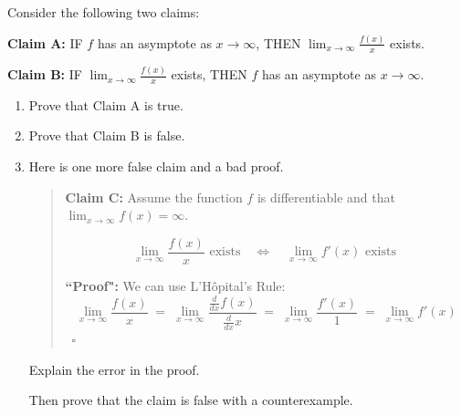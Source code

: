 \documentclass[12pt]{exam}
\newcommand {\DS} [1] {${\displaystyle #1}$}
\begin{document}
\begin{enumerate}
Consider the following two claims:	
			\begin{center}
				{\bf Claim A:} \quad \quad
					IF $f$ has an asymptote as $x \to \infty$,  \quad
					THEN \DS{\lim_{x \to \infty} \frac{f(x)}{x}} exists.
				
				{\bf Claim B:} \quad \quad 		
					IF \DS{\lim_{x \to \infty} \frac{f(x)}{x}} exists, \quad
					THEN $f$ has an asymptote as $x \to \infty$.
			\end{center}
	\begin{enumerate}
		\item Prove that Claim A is true.
		\item Prove that Claim B is false.

		\item  Here is one more false claim and a bad proof.
			\begin{quotation}
				\noindent
				{\bf Claim C:} Assume the function $f$ is differentiable and that \DS{\lim_{x \to \infty} f(x) = \infty}.
				
				$$  \lim_{x \to \infty} \frac{f(x)}{x} \mbox{ exists} \quad \iff \quad \lim_{x \to \infty} f'(x) \mbox{ exists } $$
				
				
				\noindent
				{\bf ``Proof":}  We can use L'H\^{o}pital's Rule:
					$$
						\lim_{x \to \infty} \frac{f(x)}{x} \; = \; \lim_{x \to \infty} \frac{\frac{d}{dx} f(x)}{\frac{d}{dx} x} 
							\; = \; \lim_{x \to \infty} \frac{f'(x)}{1} \; = \; \lim_{x \to \infty} f'(x)
					$$
					\ \hfill $\square$
			\end{quotation}
			Explain the  error in the proof.
			
			Then prove that the claim is false with a counterexample.
	\end{enumerate}

\end{enumerate}
\end{document}
